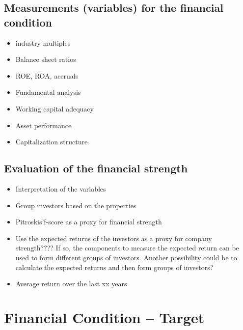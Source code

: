 \documentclass[12pt]{article}
\begin{document}
    
\subsection{Measurements (variables) for the financial condition} 
    
    \begin{itemize}

        \item industry multiples
        \item Balance sheet ratios
        \item ROE, ROA, accruals 
        \item Fundamental analysis
        \item Working capital adequacy
        \item Asset performance
        \item Capitalization structure

    \end{itemize}
    
\subsection{Evaluation of the financial strength} 
    
    \begin{itemize}

        \item Interpretation of the variables
        \item Group investors based on the properties
        \item Pitroskis'f-score as a proxy for financial strength
        \item Use the expected returns of the investors as a proxy for company strength???? If so, the components to measure the expected return can be used to form different groups of investors. Another possibility could be to calculate the expected returns and then form groups of investors? 
        \item Average return over the last xx years 

    \end{itemize}

\section{Financial Condition -- Target}
\end{document}
